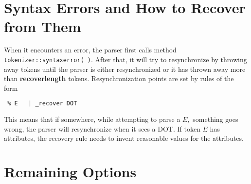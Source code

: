 \documentclass{article}
\begin{document}
\section{Syntax Errors and How to Recover from Them}
 
\noindent
When it encounters an error, the parser first calls method 
\verb+tokenizer::syntaxerror( )+.
After that, it will try to resynchronize by throwing away tokens until
the parser is either resynchronized or it has thrown away 
more than {\bf recoverlength} tokens.
Resynchronization points are set by rules of the form
\begin{verbatim}
 % E   | _recover DOT 
\end{verbatim}
This means that if somewhere, while attempting to parse a $ E, $ 
something goes wrong, the 
parser will resynchronize when it sees a DOT.
If token $ E $ has attributes, the recovery rule needs to 
invent reasonable values for the attributes.

\section{Remaining Options}
\label{Sect_remaining}
\end{document}
